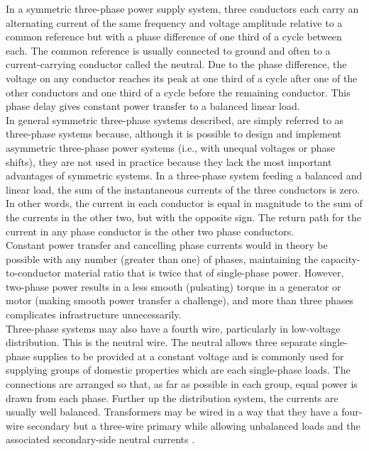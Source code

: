 In a symmetric three-phase power supply system, three conductors each carry an alternating current of the same frequency and voltage amplitude relative to a common reference but with a phase difference of one third of a cycle between each. The common reference is usually connected to ground and often to a current-carrying conductor called the neutral. Due to the phase difference, the voltage on any conductor reaches its peak at one third of a cycle after one of the other conductors and one third of a cycle before the remaining conductor. This phase delay gives constant power transfer to a balanced linear load.\\
In general symmetric three-phase systems described, are simply referred to as three-phase systems because, although it is possible to design and implement asymmetric three-phase power systems (i.e., with unequal voltages or phase shifts), they are not used in practice because they lack the most important advantages of symmetric systems. In a three-phase system feeding a balanced and linear load, the sum of the instantaneous currents of the three conductors is zero. In other words, the current in each conductor is equal in magnitude to the sum of the currents in the other two, but with the opposite sign. The return path for the current in any phase conductor is the other two phase conductors.\\
Constant power transfer and cancelling phase currents would in theory be possible with any number (greater than one) of phases, maintaining the capacity-to-conductor material ratio that is twice that of single-phase power. However, two-phase power results in a less smooth (pulsating) torque in a generator or motor (making smooth power transfer a challenge), and more than three phases complicates infrastructure unnecessarily.\\
Three-phase systems may also have a fourth wire, particularly in low-voltage distribution. This is the neutral wire. The neutral allows three separate single-phase supplies to be provided at a constant voltage and is commonly used for supplying groups of domestic properties which are each single-phase loads. The connections are arranged so that, as far as possible in each group, equal power is drawn from each phase. Further up the distribution system, the currents are usually well balanced. Transformers may be wired in a way that they have a four-wire secondary but a three-wire primary while allowing unbalanced loads and the associated secondary-side neutral currents \cite{von2006electric}.

